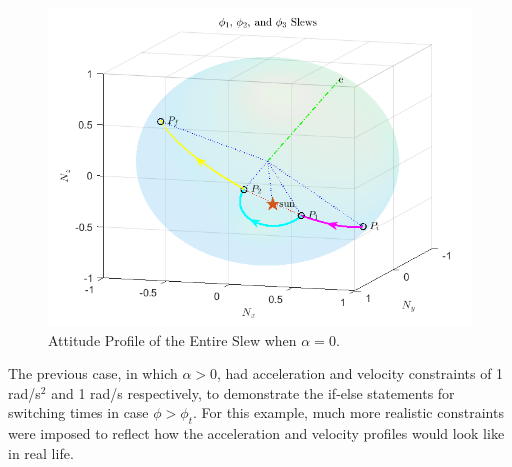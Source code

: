 \documentclass[letterpaper, preprint, paper,11pt]{AAS}	%
\begin{document}
			\begin{figure}[H]
			\begin{center}
				\includegraphics[width=4.75in]{figures/alpha0/phi1_phi2_phi3.png}
				\caption{Attitude Profile of the Entire Slew when $\alpha=0$.}
			\end{center}
			\label{fig:phi1_phi2_phi3_alpha0}
			\end{figure}	
		
The previous case, in which $\alpha > 0 $, had acceleration and velocity constraints of 1 rad/s$^2$ and 1 rad/s respectively, to demonstrate the if-else statements for switching times in case $\phi > \phi_t$. For this example, much more realistic constraints were imposed to reflect how the acceleration and velocity profiles would look like in real life. 
			
\end{document}
